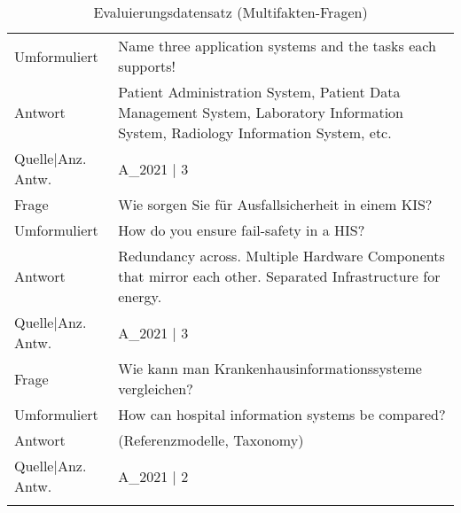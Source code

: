{\begin{landscape}
\begin{longtable}{p{3cm}p{}}
    Umformuliert & Name three application systems and the tasks each supports! \\
    Antwort & Patient Administration System, Patient Data Management System, Laboratory Information System, Radiology Information System, etc. \\
    Quelle|Anz. Antw. &  A\_2021  | 3 \\
    \midrule
    Frage & Wie sorgen Sie für Ausfallsicherheit in einem KIS? \\
    Umformuliert & How do you ensure fail-safety in a HIS? \\
    Antwort & Redundancy across.
    Multiple Hardware Components that mirror each other.
    Separated Infrastructure for energy.\\
    Quelle|Anz. Antw. &  A\_2021  | 3 \\
    \midrule
    Frage & Wie kann man Krankenhausinformationssysteme vergleichen? \\
    Umformuliert & How can hospital information systems be compared? \\
    Antwort & (Referenzmodelle, Taxonomy) \\
    Quelle|Anz. Antw. &  A\_2021  | 2 \\
    \bottomrule
    \caption*{Evaluierungsdatensatz (Multifakten-Fragen)}\label{tab:evaldata-multi}
\end{longtable}
\end{landscape}

}
